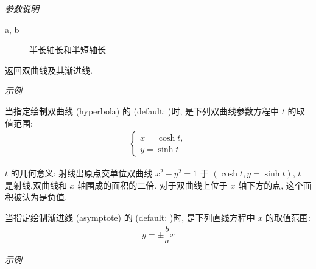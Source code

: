 \emph{参数说明}

\begin{description}
  \item[a, b] 半长轴长和半短轴长
\end{description}

返回双曲线及其渐进线.

\emph{示例}


\begin{remark*}
当指定绘制双曲线 (hyperbola) 的  (default: )时,  是下列双曲线参数方程中 $t$ 的取值范围:
\begin{align*}
  \begin{cases}
  x = \cosh t,\\y = \sinh t
  \end{cases}
\end{align*}

$t$ 的几何意义: 射线出原点交单位双曲线 $x^2-y^2=1$ 于 $(\cosh t, y = \sinh t)$,
$t$ 是射线,双曲线和 $x$ 轴围成的面积的二倍. 对于双曲线上位于 $x$ 轴下方的点, 这个面积被认为是负值.

当指定绘制渐进线 (asymptote) 的  (default: )时,  是下列直线方程中 $x$ 的取值范围:
\begin{align*}
  y = \pm \dfrac{b}{a} x
\end{align*}
\end{remark*}

\emph{示例}

